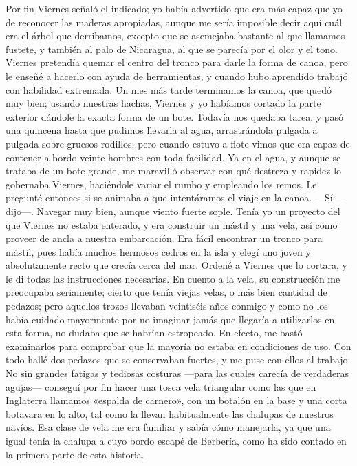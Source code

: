 \documentclass{novela}
\begin{document}
    Por fin Viernes señaló el indicado; yo había advertido que era más capaz que yo de reconocer las maderas apropiadas, aunque me sería imposible decir aquí cuál era el árbol que derribamos, excepto que se asemejaba bastante al que llamamos fustete, y también al palo de Nicaragua, al que se parecía por el olor y el tono. Viernes pretendía quemar el centro del tronco para darle la forma de canoa, pero le enseñé a hacerlo con ayuda de herramientas, y cuando hubo aprendido trabajó con habilidad extremada. Un mes más tarde terminamos la canoa, que quedó muy bien; usando nuestras hachas, Viernes y yo habíamos cortado la parte exterior dándole la exacta forma de un bote. Todavía nos quedaba tarea, y pasó una quincena hasta que pudimos llevarla al agua, arrastrándola pulgada a pulgada sobre gruesos rodillos; pero cuando estuvo a flote vimos que era capaz de contener a bordo veinte hombres con toda facilidad.
    Ya en el agua, y aunque se trataba de un bote grande, me maravilló observar con qué destreza y rapidez lo gobernaba Viernes, haciéndole variar el rumbo y empleando los remos. Le pregunté entonces si se animaba a que intentáramos el viaje en la canoa.
    —Sí —dijo—. Navegar muy bien, aunque viento fuerte sople.
    Tenía yo un proyecto del que Viernes no estaba enterado, y era construir un mástil y una vela, así como proveer de ancla a nuestra embarcación. Era fácil encontrar un tronco para mástil, pues había muchos hermosos cedros en la isla y elegí uno joven y absolutamente recto que crecía cerca del mar. Ordené a Viernes que lo cortara, y le di todas las instrucciones necesarias. En cuento a la vela, su construcción me preocupaba seriamente; cierto que tenía viejas velas, o más bien cantidad de pedazos; pero aquellos trozos llevaban veintiséis años conmigo y como no los había cuidado mayormente por no imaginar jamás que llegaría a utilizarlos en esta forma, no dudaba que se habrían estropeado.
    En efecto, me bastó examinarlos para comprobar que la mayoría no estaba en condiciones de uso. Con todo hallé dos pedazos que se conservaban fuertes, y me puse con ellos al trabajo. No sin grandes fatigas y tediosas costuras —para las cuales carecía de verdaderas agujas— conseguí por fin hacer una tosca vela triangular como las que en Inglaterra llamamos «espalda de carnero», con un botalón en la base y una corta botavara en lo alto, tal como la llevan habitualmente las chalupas de nuestros navíos. Esa clase de vela me era familiar y sabía cómo manejarla, ya que una igual tenía la chalupa a cuyo bordo escapé de Berbería, como ha sido contado en la primera parte de esta historia.
\end{document}
